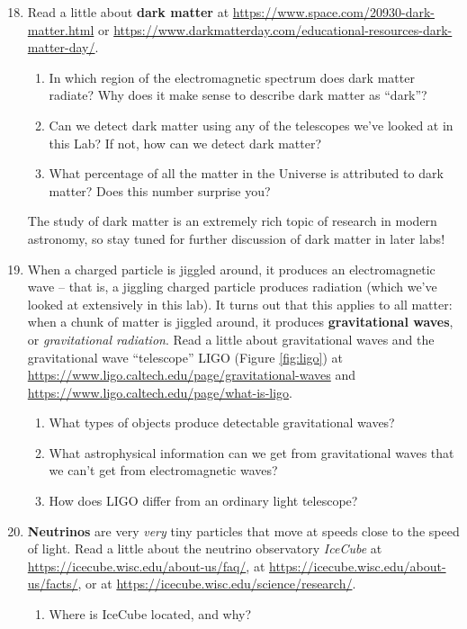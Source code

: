 \documentclass[11pt]{article}
\begin{document}
\begin{enumerate}
    \setcounter{enumi}{17}
    \item Read a little about \textbf{dark matter} at \url{https://www.space.com/20930-dark-matter.html} or \url{https://www.darkmatterday.com/educational-resources-dark-matter-day/}. 
    \begin{enumerate}[label=(\alph*)]
        \item In which region of the electromagnetic spectrum does dark matter radiate? Why does it make sense to describe dark matter as ``dark''? 
        
        \item Can we detect dark matter using any of the telescopes we've looked at in this Lab? If not, how can we detect dark matter?
        
        \item What percentage of all the matter in the Universe is attributed to dark matter? Does this number surprise you? 
    \end{enumerate}
    The study of dark matter is an extremely rich topic of research in modern astronomy, so stay tuned for further discussion of dark matter in later labs!
    
    \item When a charged particle is jiggled around, it produces an electromagnetic wave -- that is, a jiggling charged particle produces radiation (which we've looked at extensively in this lab). It turns out that this applies to all matter: when a chunk of matter is jiggled around, it produces \textbf{gravitational waves}, or \emph{gravitational radiation}. Read a little about gravitational waves and the gravitational wave ``telescope'' LIGO (Figure \ref{fig:ligo}) at \url{https://www.ligo.caltech.edu/page/gravitational-waves} and \url{https://www.ligo.caltech.edu/page/what-is-ligo}. 
    \begin{enumerate} [label=(\alph*)]
        \item What types of objects produce detectable gravitational waves?
    
        \item What astrophysical information can we get from gravitational waves that we can't get from electromagnetic waves?
        
        \item How does LIGO differ from an ordinary light telescope?  
    \end{enumerate}
    
    \item \textbf{Neutrinos} are very \emph{very} tiny particles that move at speeds close to the speed of light. Read a little about the neutrino observatory \emph{IceCube} at \url{https://icecube.wisc.edu/about-us/faq/}, at \url{https://icecube.wisc.edu/about-us/facts/}, or at \url{https://icecube.wisc.edu/science/research/}. 
    \begin{enumerate} [label=(\alph*)]
        \item Where is IceCube located, and why? 
        

\end{enumerate}
\end{enumerate}
\end{document}
